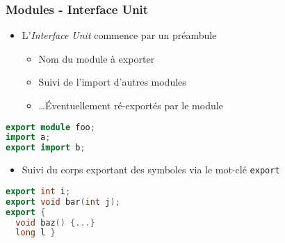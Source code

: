 \documentclass[C++.tex]{subfiles}
\begin{document}
\begin{frame}[fragile]
	\frametitle{Modules - Interface Unit}
	\begin{itemize}
		\item L'\textit{Interface Unit} commence par un préambule
		\begin{itemize}
			\item Nom du module à exporter
			\item Suivi de l'import d'autres modules
			\item \ldots Éventuellement ré-exportés par le module
		\end{itemize}
	\end{itemize}

	\begin{lstlisting}[language=C++]
export module foo;
import a;
export import b;\end{lstlisting}

	\begin{itemize}
		\item Suivi du corps exportant des symboles via le mot-clé \lstinline|export|
	\end{itemize}


	\begin{lstlisting}[language=C++]
export int i;
export void bar(int j);
export {
  void baz() {...}
  long l }\end{lstlisting}
\end{frame}
\end{document}

